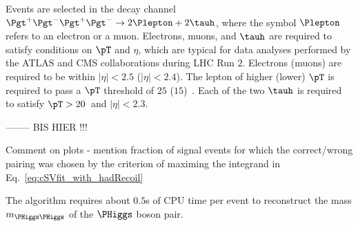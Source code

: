 Events are selected in the decay channel $\Pgt^{+}\Pgt^{-}\Pgt^{+}\Pgt^{-} \to 2\Plepton + 2\tauh$, 
where the symbol $\Plepton$ refers to an electron or a muon.
Electrons, muons, and $\tauh$ are required to satisfy conditions on $\pT$ and $\eta$, 
which are typical for data analyses performed by the ATLAS and CMS collaborations during LHC Run $2$.
Electrons (muons) are required to be within $\vert\eta\vert < 2.5$ ($\vert\eta\vert < 2.4$).
The lepton of higher (lower) $\pT$ is required to pass a $\pT$ threshold of $25$ ($15$)~\GeV.
Each of the two $\tauh$ is required to satisfy $\pT > 20$~\GeV and $\vert\eta\vert < 2.3$.

-------- BIS HIER !!!

Comment on plots
- mention fraction of signal events for which the correct/wrong pairing was chosen by the criterion of maximing the integrand in Eq.~\ref{eq:cSVfit_with_hadRecoil}

The algorithm requires about $0.5$s of CPU time per event to reconstruct the mass $m_{\PHiggs\PHiggs}$ of the $\PHiggs$ boson pair.
